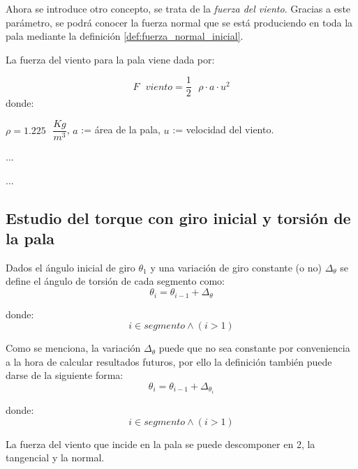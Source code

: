  
 Ahora se introduce otro concepto, se trata de la \textit{fuerza del viento}. Gracias a este parámetro, se podrá conocer la fuerza normal que se está produciendo en toda la pala mediante la definición \ref{def:fuerza_normal_inicial}.
 
 \begin{definicion}
 La fuerza del viento para la pala viene dada por:
 
 $$ F \text{ } viento = \dfrac{1}{2} \text{ } \rho \cdot a \cdot u^2$$
 donde:
 
  \centering  $\rho = 1.225 \text{ } \dfrac{Kg}{m^3}$, $a$ := área de la pala, $u$ := velocidad del viento.
 \label{def:fuerza_viento_inicial}
 \end{definicion}
 
 
 
 ...\vspace{400}
 











...
\subsection{Estudio del torque con giro inicial y torsión de la pala}



\begin{definicion}
Dados el ángulo inicial de giro $\theta_1 $ y una variación de giro constante (o no) $\Delta_\theta$ se define el ángulo de torsión de cada segmento como:
$$\theta_i = \theta_{i-1} + \Delta_\theta$$ 

    donde:
 $$i \in segmento \wedge (i > 1)$$
 
\label{def:theta_cte}
\end{definicion}



\begin{definicion}
Como se menciona, la variación $\Delta_\theta$ puede que no sea constante por conveniencia a la hora de calcular resultados futuros, por ello la definición también puede darse de la siguiente forma:
$$\theta_i = \theta_{i-1} + \Delta_{\theta_{i}}$$ 

    donde:
 $$i \in segmento \wedge (i > 1)$$
\label{def:theta_nocte}
\end{definicion}


La fuerza del viento que incide en la pala se puede descomponer en 2, la tangencial y la normal. \\

